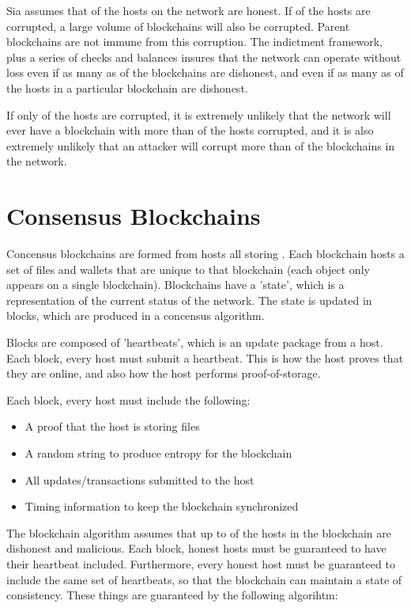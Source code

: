 \documentclass[twocolumn]{article}
\begin{document}
Sia assumes that \fiftyone \space of the hosts on the network are honest.
If \fortynine \space of the hosts are corrupted, a large volume of blockchains will also be corrupted.
Parent blockchains are not immune from this corruption.
The indictment framework, plus a series of checks and balances insures that the network can operate without loss even if as many as \maxcorruption \space of the blockchains are dishonest, and even if as many as \maxcorruption \space of the hosts in a particular blockchain are dishonest.

If only \fortynine \space of the hosts are corrupted, it is extremely unlikely that the network will ever have a blockchain with more than \maxcorruption \space of the hosts corrupted, and it is also extremely unlikely that an attacker will corrupt more than \maxcorruption \space of the blockchains in the network.

\section{Consensus Blockchains}

Concensus blockchains are formed from \numhosts \space hosts all storing \storageperhost.
Each blockchain hosts a set of files and wallets that are unique to that blockchain (each object only appears on a single blockchain).
Blockchains have a 'state', which is a representation of the current status of the network.
The state is updated in blocks, which are produced in a concensus algorithm.

Blocks are composed of 'heartbeats', which is an update package from a host.
Each block, every host must submit a heartbeat.
This is how the host proves that they are online, and also how the host performs proof-of-storage.

Each block, every host must include the following:
\begin{itemize}
	\item A proof that the host is storing files
	\item A random string to produce entropy for the blockchain
	\item All updates/transactions submitted to the host
	\item Timing information to keep the blockchain synchronized
\end{itemize}

The blockchain algorithm assumes that up to \fortynine \space of the hosts in the blockchain are dishonest and malicious.
Each block, honest hosts must be guaranteed to have their heartbeat included.
Furthermore, every honest host must be guaranteed to include the same set of heartbeats, so that the blockchain can maintain a state of consistency.
These things are guaranteed by the following algorihtm:
\end{document}
